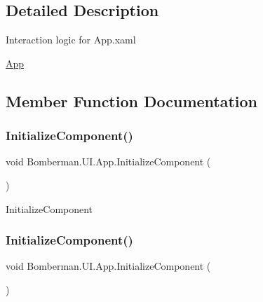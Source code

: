 \subsection{Detailed Description}
Interaction logic for App.\+xaml 

\mbox{\hyperlink{class_bomberman_1_1_u_i_1_1_app}{App}}

\subsection{Member Function Documentation}
\mbox{\label{class_bomberman_1_1_u_i_1_1_app_ae3504e2ca42f1397b3fec22278c55cfe}} 
\subsubsection{\texorpdfstring{InitializeComponent()}{InitializeComponent()}\hspace{0.1cm}{\footnotesize\ttfamily [1/2]}}
{\footnotesize\ttfamily void Bomberman.\+U\+I.\+App.\+Initialize\+Component (\begin{DoxyParamCaption}{ }\end{DoxyParamCaption})\hspace{0.3cm}{\ttfamily [inline]}}



Initialize\+Component 

\mbox{\label{class_bomberman_1_1_u_i_1_1_app_ae3504e2ca42f1397b3fec22278c55cfe}} 
\subsubsection{\texorpdfstring{InitializeComponent()}{InitializeComponent()}\hspace{0.1cm}{\footnotesize\ttfamily [2/2]}}
{\footnotesize\ttfamily void Bomberman.\+U\+I.\+App.\+Initialize\+Component (\begin{DoxyParamCaption}{ }\end{DoxyParamCaption})\hspace{0.3cm}{\ttfamily [inline]}}



